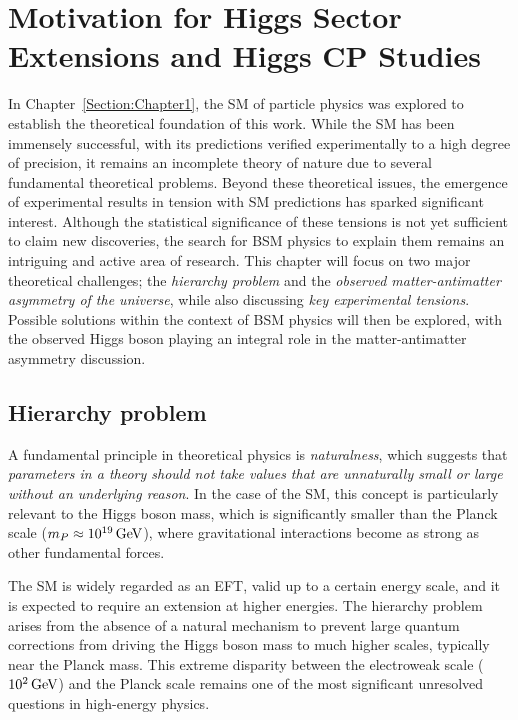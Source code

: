 \chapter{Motivation for Higgs Sector Extensions and Higgs CP Studies}
\thispagestyle{plain}  %
\pagestyle{chapterpages}
\label{Section:Chapter2}

\minitoc

In Chapter~\ref{Section:Chapter1}, the \ac{SM} of particle physics was explored to establish the theoretical foundation of this work. While the \ac{SM} has been immensely successful, with its predictions verified experimentally to a high degree of precision, it remains an incomplete theory of nature due to several fundamental theoretical problems. Beyond these theoretical issues, the emergence of experimental results in tension with \ac{SM} predictions has sparked significant interest. Although the statistical significance of these tensions is not yet sufficient to claim new discoveries, the search for BSM physics to explain them remains an intriguing and active area of research. This chapter will focus on two major theoretical challenges; the \textit{hierarchy problem} and the \textit{observed matter-antimatter asymmetry of the universe}, while also discussing \textit{key experimental tensions}. Possible solutions within the context of \ac{BSM} physics will then be explored, with the observed Higgs boson playing an integral role in the matter-antimatter asymmetry discussion.

\section{Hierarchy problem}

A fundamental principle in theoretical physics is \textit{naturalness}, which suggests that \textit{parameters in a theory should not take values that are unnaturally small or large without an underlying reason}. In the case of the \ac{SM}, this concept is particularly relevant to the Higgs boson mass, which is significantly smaller than the Planck scale ($m_P \approx 10^{19} \,\text{Ge\hspace{-.08em}V}$), where gravitational interactions become as strong as other fundamental forces.

The \ac{SM} is widely regarded as an \ac{EFT}, valid up to a certain energy scale, and it is expected to require an extension at higher energies. The hierarchy problem arises from the absence of a natural mechanism to prevent large quantum corrections from driving the Higgs boson mass to much higher scales, typically near the Planck mass. This extreme disparity between the electroweak scale ($10^2 \,\text{Ge\hspace{-.08em}V}$) and the Planck scale remains one of the most significant unresolved questions in high-energy physics.

